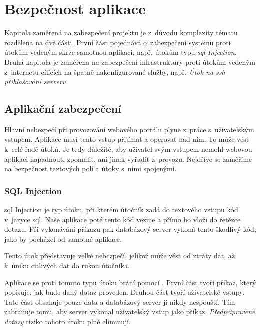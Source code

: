 \section{Bezpečnost aplikace}\label{sec:security}

Kapitola zaměřená na zabezpečení projektu \bso{} je z~důvodu komplexity tématu rozdělena na dvě části.
První část pojednává o~zabezpečení systému proti útokům vedeným skrze samotnou aplikaci, např. útokům typu \emph{\acrshort{sql} Injection}.
Druhá kapitola je zaměřena na zabezpečení infrastruktury proti útokům vedeným z~internetu cílících na špatně nakonfigurované služby,
např. \emph{Útok na \acrshort{ssh} přihlašování serveru}.

\subsection{Aplikační zabezpečení}

Hlavní nebezpečí při provozování webového portálu plyne z~práce s~uživatelským vstupem.
Aplikace musí tento vstup přijímat a operovat nad ním. To může vést k~celé řadě útoků.
Je tedy důležité, aby uživatel svým vstupem nemohl webovou aplikaci napadnout, zpomalit, ani jinak vyřadit z~provozu.
Nejdříve se zaměříme na bezpečnost textových polí a útoky s~nimi spojenými.

\subsubsection{SQL Injection}

\acrshort{sql} Injection\cite{sqlinject} je typ útoku, při kterém útočník zadá do textového vstupu kód v~jazyce \acrshort{sql}.
Naše aplikace poté tento kód vezme a přímo ho vloží do řetězce dotazu.
Při vykonávání příkazu pak databázový server vykoná tento škodlivý kód, jako by pocházel od samotné aplikace.

Tento útok představuje velké nebezpečí, jelikož může vést od ztráty dat, až k~úniku citlivých dat do rukou útočníka.

Aplikace \bso{} se proti tomuto typu útoku brání pomocí .
První část tvoří příkaz, který popisuje, jak bude daný dotaz proveden.
Druhou část tvoří uživatelské vstupy.
Tato část obsahuje pouze data a databázový server ji nikdy nespouští.
Tím zabraňuje tomu, aby server vykonal uživatelský vstup jako příkaz.
\emph{Předpřipravené dotazy}\cite{mysqlprepstmt} riziko tohoto útoku plně eliminují.

